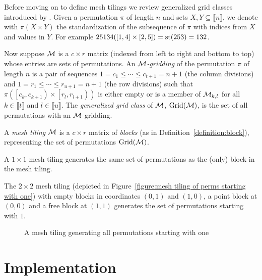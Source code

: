 Before moving on to define mesh tilings we review generalized grid classes 
introduced by \textcite{vatter_small_2011}. Given a permutation $\pi$ of length 
$n$ and sets $X, Y \subseteq \llbracket n \rrbracket$, we denote with $\pi( X 
\times Y )$ the standardization of the subsequence of $\pi$ with indices from 
$X$ and values in $Y$. For example $25134([1, 4] \times [2, 5]) = \mathrm{st}(253) = 
132$.

Now suppose ${\mathcal{M}}$ is a $c \times r$ matrix (indexed from left to right and 
bottom to top) whose entries are sets of permutations. An 
\emph{${\mathcal{M}}$-gridding} of the permutation $\pi$ of length $n$ is a pair of 
sequences $1 = c_1 \leq \cdots \leq c_{t+1} = n + 1$ (the column divisions) 
and $1 = r_1 \leq \cdots \leq r_{u+1} = n + 1$ (the row divisions) such that 
$\pi(\left[c_k, c_{k+1} \right) \times \left[r_l, r_{l+1} \right))$ is either 
empty or is a member of ${\mathcal{M}}_{k,l}$ for all $k \in \llbracket t \rrbracket$ 
and $l \in \llbracket u \rrbracket$. The \emph{generalized grid class} of 
${\mathcal{M}}$, $\mathrm{Grid\!\left({\mathcal{M}}\right)}$, is the set of all permutations with an 
${\mathcal{M}}$-gridding.

\begin{definition}
  A \emph{mesh tiling} ${\mathcal{M}}$ is a $c \times r$ matrix of \emph{blocks} (as in 
  Definition~\ref{definition:block}), representing the set of permutations 
  $\mathrm{Grid\!\left({\mathcal{M}}\right)}$.
\end{definition}

A $1 \times 1$ mesh tiling generates the same set of permutations as the (only) 
block in the mesh tiling.

\begin{example}
  The $2 \times 2$ mesh tiling (depicted in Figure~\ref{figure:mesh tiling of 
  perms starting with one}) with empty blocks in coordinates $(0, 1)$ and 
  $(1, 0)$, a point block at $(0, 0)$ and a free block at $(1, 1)$ generates 
  the set of permutations starting with $1$.

  \begin{figure}[htbp]
    \center
    \caption{A mesh tiling generating all permutations starting with one}
    \label{figure:mesh tiling of perms starting with one}
  \end{figure}
\end{example}


\section{Implementation\label{mesh tilings implementation}}

